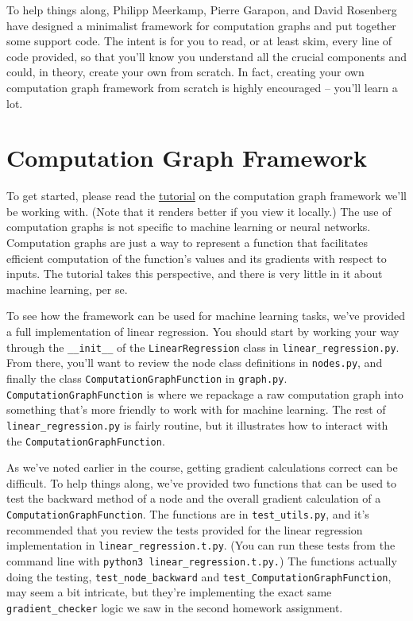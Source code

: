 \documentclass{article}
\theoremstyle{plain}
\theoremstyle{definition}
\begin{document}
To help things along, Philipp Meerkamp, Pierre Garapon, and David Rosenberg
have designed a minimalist framework for computation graphs and put
together some support code. The intent is for you to read, or at least
skim, every line of code provided, so that you'll know you understand
all the crucial components and could, in theory, create your own from
scratch. In fact, creating your own computation graph framework from
scratch is highly encouraged -- you'll learn a lot. 

\section{Computation Graph Framework }

To get started, please read the \href{https://github.com/davidrosenberg/mlcourse/blob/gh-pages/Notebooks/computation-graph/computation-graph-framework.ipynb}{tutorial}
on the computation graph framework we'll be working with. (Note that
it renders better if you view it locally.) The use of computation
graphs is not specific to machine learning or neural networks. Computation
graphs are just a way to represent a function that facilitates efficient
computation of the function's values and its gradients with respect
to inputs. The tutorial takes this perspective, and there is very
little in it about machine learning, per se. 

To see how the framework can be used for machine learning tasks, we've
provided a full implementation of linear regression. You should start
by working your way through the \texttt{\_\_init\_\_} of the \texttt{LinearRegression}
class in \texttt{linear\_regression.py}. From there, you'll want to
review the node class definitions in \texttt{nodes.py}, and finally
the class \texttt{ComputationGraphFunction} in \texttt{graph.py}. \texttt{ComputationGraphFunction}
is where we repackage a raw computation graph into something that's
more friendly to work with for machine learning. The rest of \texttt{linear\_regression.py}
is fairly routine, but it illustrates how to interact with the \texttt{ComputationGraphFunction}.

As we've noted earlier in the course, getting gradient calculations
correct can be difficult. To help things along, we've provided two
functions that can be used to test the backward method of a node and
the overall gradient calculation of a \texttt{ComputationGraphFunction}.
The functions are in \texttt{test\_utils.py}, and it's recommended
that you review the tests provided for the linear regression implementation
in \texttt{linear\_regression.t.py}. (You can run these tests from
the command line with \texttt{python3 linear\_regression.t.py.}) The
functions actually doing the testing, \texttt{test\_node\_backward}
and \texttt{test\_ComputationGraphFunction}, may seem a bit intricate,
but they're implementing the exact same \texttt{gradient\_checker}
logic we saw in the second homework assignment.
\end{document}
